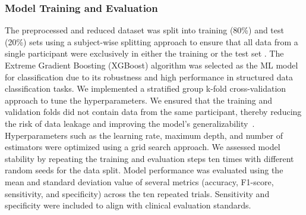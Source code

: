 \documentclass[sensors,article,accept,pdftex,moreauthors]{Definitions/mdpi}
\begin{document}
\subsubsection{Model Training and Evaluation}
The preprocessed and reduced dataset was split into training (80\%) and test (20\%) sets using a subject-wise splitting approach to ensure that all data from a single participant were exclusively in either the training or the test set \cite{Saeb2017}. The Extreme Gradient Boosting (XGBoost) algorithm \cite{chen2016xgboost} was selected as the ML model for classification due to its robustness and high performance in structured data classification tasks. We implemented a stratified group k-fold cross-validation approach to tune the hyperparameters. We ensured that the training and validation folds did not contain data from the same participant, thereby reducing the risk of data leakage and improving the model's generalizability{~\cite{kapoor2023leakage}}. Hyperparameters such as the learning rate, maximum depth, and number of estimators were optimized using a grid search approach.
We assessed model stability by repeating the training and evaluation steps ten times with different random seeds for the data split. Model performance was evaluated using the mean and standard deviation value of several metrics (accuracy, F1-score, sensitivity, and specificity) across the ten repeated trials. Sensitivity and specificity were included to align with clinical evaluation standards.
\end{document}
